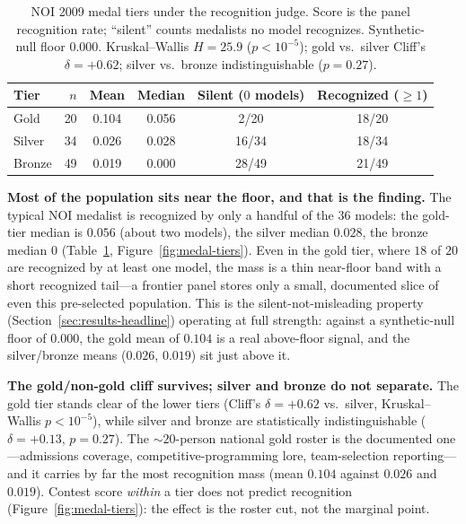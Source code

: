 \begin{table}[!htbp]
\centering
\small
\caption{NOI 2009 medal tiers under the recognition judge. Score is the panel recognition rate; ``silent'' counts medalists no model recognizes. Synthetic-null floor $0.000$. Kruskal--Wallis $H = 25.9$ ($p < 10^{-5}$); gold vs.\ silver Cliff's $\delta = +0.62$; silver vs.\ bronze indistinguishable ($p = 0.27$).}
\label{tab:medal-tiers}
\begin{tabular}{lrcccc}
\toprule
Tier & $n$ & Mean & Median & Silent ($0$ models) & Recognized ($\geq 1$) \\
\midrule
Gold & 20 & 0.104 & 0.056 & 2/20 & 18/20 \\
Silver & 34 & 0.026 & 0.028 & 16/34 & 18/34 \\
Bronze & 49 & 0.019 & 0.000 & 28/49 & 21/49 \\
\bottomrule
\end{tabular}
\end{table}

\textbf{Most of the population sits near the floor, and that is the finding.} The typical NOI medalist is recognized by only a handful of the $36$ models: the gold-tier median is $0.056$ (about two models), the silver median $0.028$, the bronze median $0$ (Table~\ref{tab:medal-tiers}, Figure~\ref{fig:medal-tiers}). Even in the gold tier, where $18$ of $20$ are recognized by at least one model, the mass is a thin near-floor band with a short recognized tail---a frontier panel stores only a small, documented slice of even this pre-selected population. This is the silent-not-misleading property (Section~\ref{sec:results-headline}) operating at full strength: against a synthetic-null floor of $0.000$, the gold mean of $0.104$ is a real above-floor signal, and the silver/bronze means ($0.026$, $0.019$) sit just above it.

\textbf{The gold/non-gold cliff survives; silver and bronze do not separate.} The gold tier stands clear of the lower tiers (Cliff's $\delta = +0.62$ vs.\ silver, Kruskal--Wallis $p < 10^{-5}$), while silver and bronze are statistically indistinguishable ($\delta = +0.13$, $p = 0.27$). The ${\sim}20$-person national gold roster is the documented one---admissions coverage, competitive-programming lore, team-selection reporting---and it carries by far the most recognition mass (mean $0.104$ against $0.026$ and $0.019$). Contest score \emph{within} a tier does not predict recognition (Figure~\ref{fig:medal-tiers}): the effect is the roster cut, not the marginal point.

